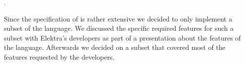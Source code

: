 .

Since the specification of  is rather extensive we decided to only implement a subset of the language. We discussed the specific required features for such a subset with Elektra’s developers as part of a presentation about the features of the language. Afterwards we decided on a subset that covered most of the features requested by the developers.




